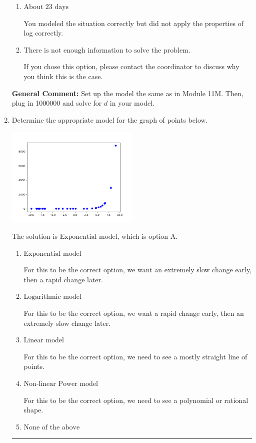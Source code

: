 \documentclass{extbook}[14pt]
\newcommand{\litem}[1]{\item #1

\rule{\textwidth}{0.4pt}}
\begin{document}
\begin{enumerate}
{\begin{enumerate}[label=\Alph*.]
You modeled the situation with $e$ as the base, but solved correctly otherwise.
\item \( \text{About } 23 \text{ days} \)

You modeled the situation correctly but did not apply the properties of log correctly.
\item \( \text{There is not enough information to solve the problem.} \)

If you chose this option, please contact the coordinator to discuss why you think this is the case.
\end{enumerate}

\textbf{General Comment:} Set up the model the same as in Module 11M. Then, plug in 1000000 and solve for $d$ in your model.
}
\litem{
Determine the appropriate model for the graph of points below.

\begin{center}
    \includegraphics[width=0.5\textwidth]{../Figures/identifyModelGraph12B.png}
\end{center}


The solution is \( \text{Exponential model} \), which is option A.\begin{enumerate}[label=\Alph*.]
\item \( \text{Exponential model} \)

For this to be the correct option, we want an extremely slow change early, then a rapid change later.
\item \( \text{Logarithmic model} \)

For this to be the correct option, we want a rapid change early, then an extremely slow change later.
\item \( \text{Linear model} \)

For this to be the correct option, we need to see a mostly straight line of points.
\item \( \text{Non-linear Power model} \)

For this to be the correct option, we need to see a polynomial or rational shape.
\item \( \text{None of the above} \)


\end{enumerate}}
\end{enumerate}
\end{document}
